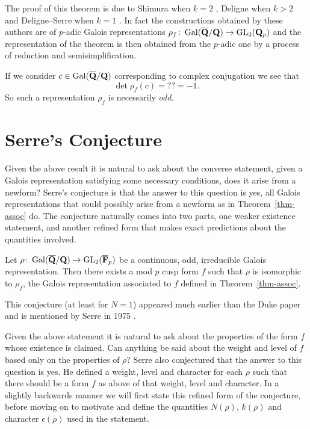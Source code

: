 \documentclass[a4paper,12pt]{article}
\begin{document}
The proof of this theorem is due to Shimura when $k = 2$ \cite{Shimura}, Deligne when $k > 2$ \cite{Deligne} and Deligne--Serre when $k = 1$ \cite{DeligneSerre}.
In fact the constructions obtained by these authors are of $p$-adic Galois representations $\rho_f\colon \operatorname{Gal}(\overline{\mathbf{Q}}/\mathbf{Q}) \to \operatorname{GL}_2(\mathbf{Q}_p)$ and the representation of the theorem is then obtained from the $p$-adic one by a process of reduction and semisimplification. %

If we consider $c\in \operatorname{Gal}(\overline{\mathbf{Q}}/\mathbf{Q})$ corresponding to complex conjugation we see that
\[
\det\rho_f(c) = ?? = -1.%
\]
So such a representation $\rho_f$ is necessarily \emph{odd}.



\section{Serre's Conjecture}
Given the above result it is natural to ask about the converse statement, given a Galois representation satisfying some necessary conditions, does it arise from a newform?
Serre's conjecture is that the answer to this question is yes, all Galois representations that could possibly arise from a newform as in Theorem~\ref{thm-assoc} do.
The conjecture naturally comes into two parts, one weaker existence statement, and another refined form that makes exact predictions about the quantities involved.

\begin{conjecture}\label{conj-qual}
Let $\rho\colon \operatorname{Gal}(\overline{\mathbf{Q}}/\mathbf{Q}) \to \operatorname{GL}_2(\overline{\mathbf{F}}_p)$ be a continuous, odd, irreducible Galois representation.
Then there exists a mod $p$ cusp form $f$ such that $\rho$ is isomorphic to $\rho_f$, the Galois representation associated to $f$ defined in Theorem~\ref{thm-assoc}.
\end{conjecture}

This conjecture (at least for $N = 1$) appeared much earlier than the Duke paper and is mentioned by Serre in 1975 \cite{Serre75}.


Given the above statement it is natural to ask about the properties of the form $f$ whose existence is claimed.
Can anything be said about the weight and level of $f$ based only on the properties of $\rho$?
Serre also conjectured that the answer to this question is yes.
He defined a weight, level and character for each $\rho$ such that there should be a form $f$ as above of that weight, level and character.
In a slightly backwards manner we will first state this refined form of the conjecture, before moving on to motivate and define the quantities $N(\rho)$, $k(\rho)$ and character $\epsilon(\rho)$ used in the statement.
\end{document}
